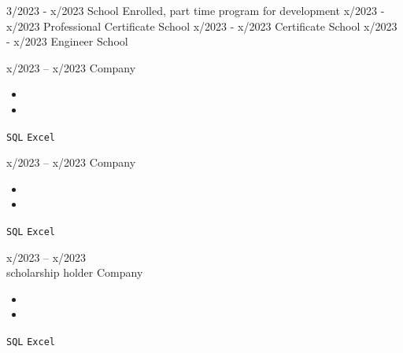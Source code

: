 \documentclass[9pt]{developercv} %
\begin{document}
    \vspace{-10 pt}
    \begin{entrylist}
        \entry
        {3/2023 - x/2023}
        {\lipsum[1][1] }
        {School}
        {Enrolled, part time program for development}
        \entry
        {x/2023 - x/2023}
        {Professional Certificate}
        {School}
        {\lipsum[1][1]}
        \entry
        {x/2023 - x/2023}
        {Certificate}
        {School}
        {\lipsum[1][2]}
        \entry
        {x/2023 - x/2023}
        {Engineer}
        {School}
        {\lipsum[1][2]}
    \end{entrylist}

    \vspace{-10 pt}
    \begin{entrylist}
        \entry
        {x/2023 -- x/2023}
        {\lipsum[1][1]}
        {Company}
        {\vspace{-10pt}
            \begin{itemize}[noitemsep,topsep=0pt,parsep=0pt,partopsep=0pt, leftmargin=-1pt]
                \item \lipsum[1][1-2]
                \item \lipsum[1][3-4]
            \end{itemize}
            \texttt{SQL} \slashsep \texttt{Excel}}
        \entry
        {x/2023 -- x/2023}
        {\lipsum[1][1]}
        {Company}
        {\vspace{-10pt}
            \begin{itemize}[noitemsep,topsep=0pt,parsep=0pt,partopsep=0pt, leftmargin=-1pt]
                \item \lipsum[1][1-2]
                \item \lipsum[1][3-4]
            \end{itemize}
            \texttt{SQL} \slashsep \texttt{Excel}}
        \entry
        {x/2023 -- x/2023 \\\footnotesize{scholarship holder}}
        {\lipsum[1][1]}
        {Company}
        {\vspace{-10pt}
            \begin{itemize}[noitemsep,topsep=0pt,parsep=0pt,partopsep=0pt, leftmargin=-1pt]
                \item \lipsum[1][1-2]
                \item \lipsum[1][3-4]
            \end{itemize}
            \texttt{SQL} \slashsep \texttt{Excel}}
    \end{entrylist}
\end{document}
